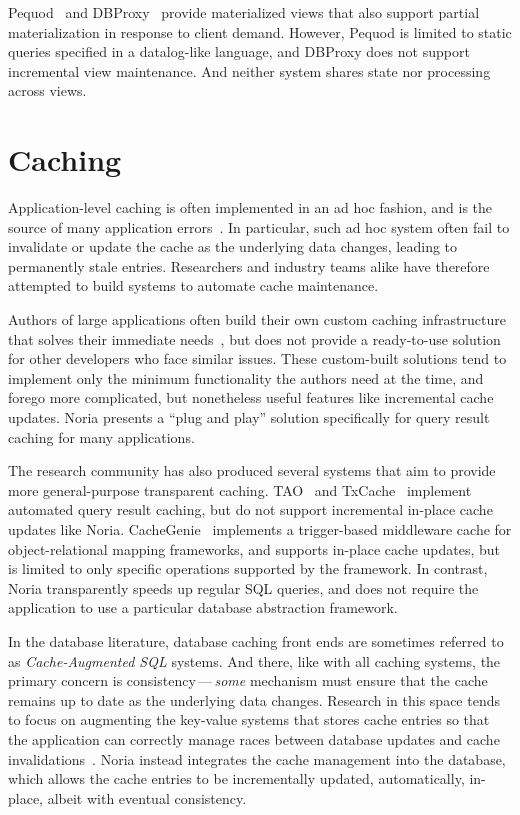Pequod~\cite{pequod} and DBProxy~\cite{dbproxy} provide materialized views that
also support partial materialization in response to client demand. However,
Pequod is limited to static queries specified in a datalog-like language, and
DBProxy does not support incremental view maintenance. And neither system shares
state nor processing across views.

\section{Caching}

Application-level caching is often implemented in an ad hoc fashion, and is the
source of many application errors~\cite{ad-hoc-caching}. In particular, such ad
hoc system often fail to invalidate or update the cache as the underlying data
changes, leading to permanently stale entries. Researchers and industry teams
alike have therefore attempted to build systems to automate cache maintenance.

Authors of large applications often build their own custom caching
infrastructure that solves their immediate needs~\cite{facebook-memcache,
flannel}, but does not provide a ready-to-use solution for other developers who
face similar issues. These custom-built solutions tend to implement only the
minimum functionality the authors need at the time, and forego more complicated,
but nonetheless useful features like incremental cache updates. Noria presents a
``plug and play'' solution specifically for query result caching for many
applications.

The research community has also produced several systems that aim to provide
more general-purpose transparent caching. TAO~\cite{tao} and
TxCache~\cite{txcache} implement automated query result caching, but do not
support incremental in-place cache updates like Noria.
CacheGenie~\cite{cachegenie} implements a trigger-based middleware cache for
object-relational mapping frameworks, and supports in-place cache updates, but
is limited to only specific operations supported by the framework. In contrast,
Noria transparently speeds up regular SQL queries, and does not require the
application to use a particular database abstraction framework.

In the database literature, database caching front ends are sometimes referred
to as \textit{Cache-Augmented SQL} systems. And there, like with all caching
systems, the primary concern is consistency\,---\,\emph{some} mechanism must
ensure that the cache remains up to date as the underlying data changes.
Research in this space tends to focus on augmenting the key-value systems that
stores cache entries so that the application can correctly manage races between
database updates and cache invalidations~\cite{facebook-memcache,
casql-consistency, casql-consistency-thesis}. Noria instead integrates the cache
management into the database, which allows the cache entries to be incrementally
updated, automatically, in-place, albeit with eventual consistency.

